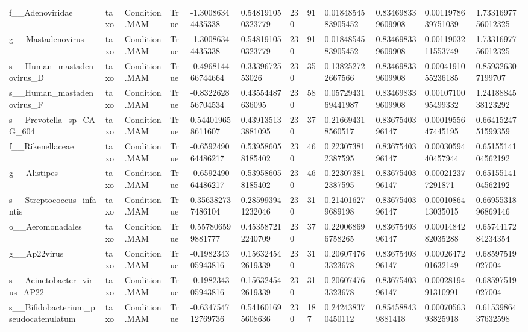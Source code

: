 \begin{longtable}{llllllllllll}
f\_\_Adenoviridae & taxo & Condition.MAM & True & -1.30086344435338 & 0.548191050323779 & 230 & 91 & 0.0184854583905452 & 0.834698339609908 & 0.0011978639751039 & 1.7331697756012325 \\
g\_\_Mastadenovirus & taxo & Condition.MAM & True & -1.30086344435338 & 0.548191050323779 & 230 & 91 & 0.0184854583905452 & 0.834698339609908 & 0.0011903211553749 & 1.7331697756012325 \\
s\_\_Human\_mastadenovirus\_D & taxo & Condition.MAM & True & -0.496814466744664 & 0.3339672553026 & 230 & 35 & 0.138252722667566 & 0.834698339609908 & 0.0004191055236185 & 0.859326307199707 \\
s\_\_Human\_mastadenovirus\_F & taxo & Condition.MAM & True & -0.832262856704534 & 0.43554487636095 & 230 & 58 & 0.0572943169441987 & 0.834698339609908 & 0.0010710095499332 & 1.2418884538123292 \\
s\_\_Prevotella\_sp\_CAG\_604 & taxo & Condition.MAM & True & 0.544019658611607 & 0.439135133881095 & 230 & 37 & 0.216694318560517 & 0.8367540396147 & 0.0001955647445195 & 0.6641524751599359 \\
f\_\_Rikenellaceae & taxo & Condition.MAM & True & -0.659249064486217 & 0.539586058185402 & 230 & 46 & 0.223073812387595 & 0.8367540396147 & 0.0003059440457944 & 0.6515514104562192 \\
g\_\_Alistipes & taxo & Condition.MAM & True & -0.659249064486217 & 0.539586058185402 & 230 & 46 & 0.223073812387595 & 0.8367540396147 & 0.000212377291871 & 0.6515514104562192 \\
s\_\_Streptococcus\_infantis & taxo & Condition.MAM & True & 0.356382737486104 & 0.285993941232046 & 230 & 31 & 0.214016279689198 & 0.8367540396147 & 0.0001086413035015 & 0.6695531896869146 \\
o\_\_Aeromonadales & taxo & Condition.MAM & True & 0.557806599881777 & 0.453587212240709 & 230 & 37 & 0.220068696758265 & 0.8367540396147 & 0.0001484282035288 & 0.6574417284234354 \\
g\_\_Ap22virus & taxo & Condition.MAM & True & -0.198234305943816 & 0.156324542619339 & 230 & 31 & 0.206074763323678 & 0.8367540396147 & 0.0002647201632149 & 0.68597519027004 \\
s\_\_Acinetobacter\_virus\_AP22 & taxo & Condition.MAM & True & -0.198234305943816 & 0.156324542619339 & 230 & 31 & 0.206074763323678 & 0.8367540396147 & 0.0002819491310991 & 0.68597519027004 \\
s\_\_Bifidobacterium\_pseudocatenulatum & taxo & Condition.MAM & True & -0.634754712769736 & 0.541601695608636 & 230 & 187 & 0.242438370450112 & 0.854588439881418 & 0.0007056393825918 & 0.6153986437632598 \\

\end{longtable}

